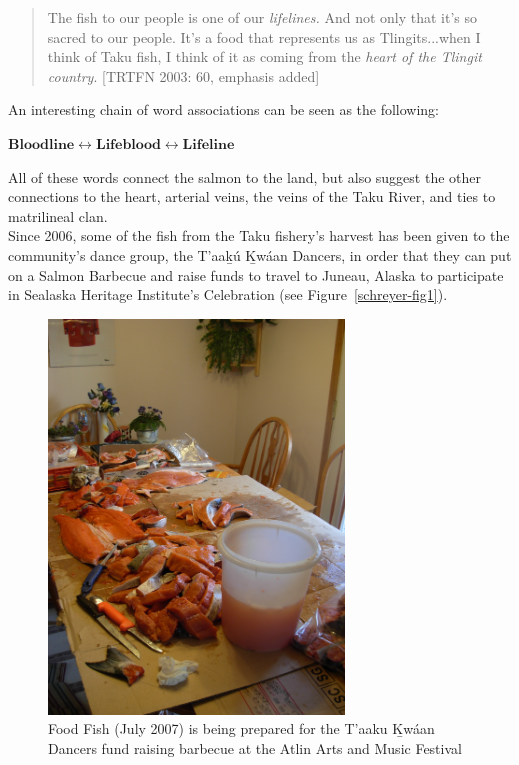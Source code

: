 \begin{quote}
The fish to our people is one of our \textit{lifelines.} And not only that it’s so sacred to our people. It’s a food that represents us as Tlingits...when I think of Taku fish, I think of it as coming from the \textit{heart of the Tlingit country}. [TRTFN 2003: 60, emphasis added]
\end{quote}
\noindent
An interesting chain of word associations can be seen as the following:

\begin{center}
$ \textbf{Bloodline} \longleftrightarrow  \textbf{Lifeblood} \longleftrightarrow \textbf{Lifeline}$
\end{center}

All of these words connect the salmon to the land, but also suggest the other connections to the heart, arterial veins, the veins of the Taku River, and ties to matrilineal clan. \\

Since 2006, some of the fish from the Taku fishery’s harvest has been given to the community’s dance group, the T'aak̲ú K̲wáan Dancers, in order that they can put on a Salmon Barbecue and raise funds to travel to Juneau, Alaska to participate in Sealaska Heritage Institute’s Celebration (see Figure~\ref{schreyer-fig1}).

\begin{figure}
    \centering
    \includegraphics[width=0.7\textwidth]{figures/schreyer-fig2}
    \caption{Food Fish (July 2007) is being prepared for the T’aaku K̲wáan Dancers fund raising barbecue at the Atlin Arts and Music Festival}
    \label{schreyer-fig2}
\end{figure}


